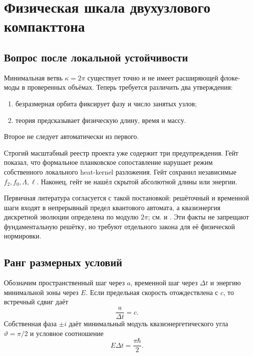 \chapter{Физическая шкала двухузлового компакттона}
\label{ch:v6-spectral-transition-discrete-compacton-physical-scale-map-gate}

\section{Вопрос после локальной устойчивости}

Минимальная ветвь $\kappa=2\pi$ существует точно и не имеет расширяющей
флоке-моды в проверенных объёмах. Теперь требуется различить два утверждения:
\begin{enumerate}
 \item безразмерная орбита фиксирует фазу и число занятых узлов;
 \item теория предсказывает физическую длину, время и массу.
\end{enumerate}
Второе не следует автоматически из первого.

Строгий масштабный реестр проекта уже содержит три предупреждения. Гейт
 показал, что формальное
планковское сопоставление нарушает режим собственного локального
heat-kernel разложения. Гейт
 сохранил
независимые $f_2,f_0,\Lambda,\ell$. Наконец, гейт
 не
нашёл скрытой абсолютной длины или энергии.

Первичная литература согласуется с такой постановкой: решёточный и
временной шаги входят в непрерывный предел квантового автомата, а
квазиэнергия дискретной эволюции определена по модулю $2\pi$;
см.  и . Эти факты не
запрещают фундаментальную решётку, но требуют отдельного закона для её
физической нормировки.

\section{Ранг размерных условий}

Обозначим пространственный шаг через $a$, временной шаг через $\Delta t$ и
энергию минимальной зоны через $E$. Если предельная скорость отождествлена
с $c$, то встречный сдвиг даёт
\begin{equation}
 \frac{a}{\Delta t}=c.
 \label{eq:v6-compacton-causal-scale}
\end{equation}
Собственная фаза $\pm i$ даёт минимальный модуль квазиэнергетического угла
$\vartheta=\pi/2$ и условное соотношение
\begin{equation}
 E\Delta t=\frac{\pi\hbar}{2}.
 \label{eq:v6-compacton-quasienergy-scale}
\end{equation}

